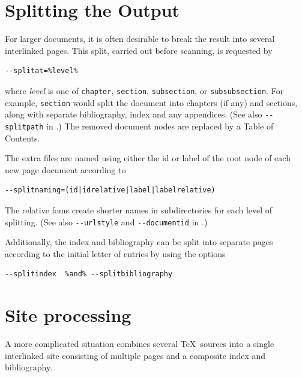 \documentclass{book}
\newcommand{\shellcode}{\lstinline[style=shell]}
\begin{document}
\section[Splitting]{Splitting the Output}\label{usage.splitting}
For larger documents, it is often desirable to break the 
result into several interlinked pages. This split,
carried out before scanning, is requested by 
\begin{lstlisting}[style=shell]
--splitat=%level%
\end{lstlisting}
where \textit{level} is one of \texttt{chapter},
\texttt{section}, \texttt{subsection}, or \texttt{subsubsection}.
For example, \texttt{section} would split the document into
chapters (if any) and sections, along with separate
bibliography, index and any appendices.
(See also \shellcode{--splitpath} in .)
The removed document nodes are replaced by a Table of Contents.

The extra files are named using either the id or label
of the root node of each new page document according to
\begin{lstlisting}[style=shell]
--splitnaming=(id|idrelative|label|labelrelative)
\end{lstlisting}
The relative foms create shorter names in subdirectories for each
level of splitting.
(See also \shellcode{--urlstyle} and  \shellcode{--documentid} in .)

Additionally, the index and bibliography can be split
into separate pages according to the initial letter of entries by using the options
\begin{lstlisting}[style=shell]
--splitindex  %and% --splitbibliography
\end{lstlisting}

\section[Sites]{Site processing}\label{usage.site}
A more complicated situation combines several \TeX\ sources
into a single interlinked site consisting of multiple pages
and a composite index and bibliography.
\end{document}
